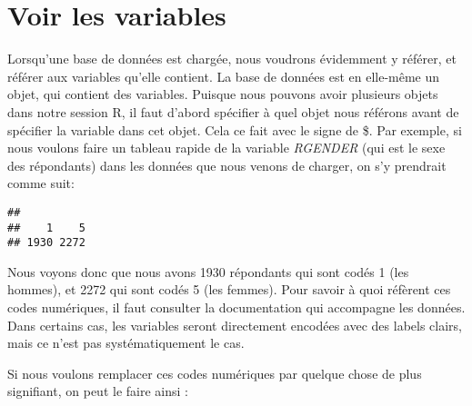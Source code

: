 \documentclass[
]{book}
\newenvironment{Shaded}{\begin{snugshade}}{\end{snugshade}}
\newcommand{\AttributeTok}[1]{\textcolor[rgb]{0.77,0.63,0.00}{#1}}
\newcommand{\CommentTok}[1]{\textcolor[rgb]{0.56,0.35,0.01}{\textit{#1}}}
\newcommand{\FunctionTok}[1]{\textcolor[rgb]{0.00,0.00,0.00}{#1}}
\newcommand{\NormalTok}[1]{#1}
\newcommand{\OtherTok}[1]{\textcolor[rgb]{0.56,0.35,0.01}{#1}}
\newcommand{\SpecialCharTok}[1]{\textcolor[rgb]{0.00,0.00,0.00}{#1}}
\newcommand{\StringTok}[1]{\textcolor[rgb]{0.31,0.60,0.02}{#1}}
\begin{document}
\hypertarget{voir-les-variables}{%
\section{Voir les variables}\label{voir-les-variables}}

Lorsqu'une base de données est chargée, nous voudrons évidemment y référer, et référer aux variables qu'elle contient. La base de données est en elle-même un objet, qui contient des variables. Puisque nous pouvons avoir plusieurs objets dans notre session R, il faut d'abord spécifier à quel objet nous référons avant de spécifier la variable dans cet objet. Cela ce fait avec le signe de \$. Par exemple, si nous voulons faire un tableau rapide de la variable \emph{RGENDER} (qui est le sexe des répondants) dans les données que nous venons de charger, on s'y prendrait comme suit:

\begin{Shaded}
\end{Shaded}

\begin{verbatim}
## 
##    1    5 
## 1930 2272
\end{verbatim}

Nous voyons donc que nous avons 1930 répondants qui sont codés 1 (les hommes), et 2272 qui sont codés 5 (les femmes). Pour savoir à quoi réfèrent ces codes numériques, il faut consulter la documentation qui accompagne les données. Dans certains cas, les variables seront directement encodées avec des labels clairs, mais ce n'est pas systématiquement le cas.

Si nous voulons remplacer ces codes numériques par quelque chose de plus signifiant, on peut le faire ainsi :

\begin{Shaded}
\end{Shaded}
\end{document}
